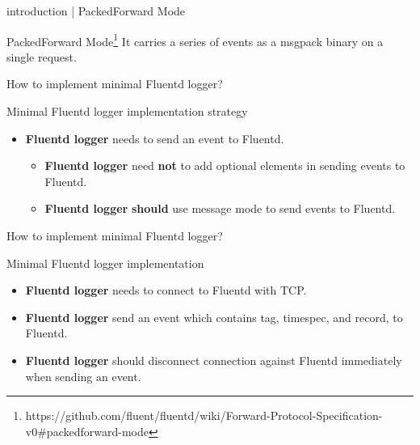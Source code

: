 \documentclass[12pt, unicode]{beamer}
\begin{document}
\begin{frame}{introduction | PackedForward Mode}
\begin{block}{PackedForward Mode\footnote[frame]{https://github.com/fluent/fluentd/wiki/Forward-Protocol-Specification-v0\#packedforward-mode}}
It carries a series of events as a msgpack binary on a single request.
\end{block}
\begin{table}[htb]
\end{table}
\end{frame}

\begin{frame}{How to implement minimal Fluentd logger?}
\begin{block}{Minimal Fluentd logger implementation strategy}
\begin{itemize}
\item {} {{\textbf {Fluentd logger}} needs to send an event to Fluentd.}
  \begin{itemize}
  \item {} {{\textbf {Fluentd logger}} need {\textbf {not}} to add optional elements in sending events to Fluentd.}
  \item {} {{\textbf {Fluentd logger}} {\textbf {should}} use message mode to send events to Fluentd.}
  \end{itemize}
\end{itemize}
\end{block}
\end{frame}

\begin{frame}{How to implement minimal Fluentd logger?}
\begin{block}{Minimal Fluentd logger implementation}
\begin{itemize}
\item {} {{\textbf {Fluentd logger}} needs to connect to Fluentd with TCP.}
\item {} {{\textbf {Fluentd logger}} send an event which contains tag, timespec, and record, to Fluentd.}
\item {} {{\textbf {Fluentd logger}} should disconnect connection against Fluentd immediately when sending an event.}
\end{itemize}
\end{block}
\end{frame}
\end{document}
